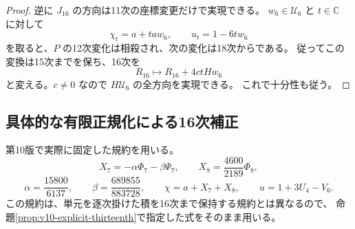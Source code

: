 \documentclass[a4paper,11pt]{ltjsarticle}
\theoremstyle{definition}
\newcommand{\CC}{\mathbb C}
\begin{document}
\begin{proof}
逆に $J_{16}$ の方向は11次の座標変更だけで実現できる。
$w_6\in\mathcal U_6$ と $t\in\CC$ に対して
\[
 \chi_t=a+taw_6,\qquad u_t=1-6tw_6
\]
を取ると、$P$ の12次変化は相殺され、次の変化は18次からである。
従ってこの変換は15次までを保ち、16次を
\[
 R_{16}\longmapsto R_{16}+4ctHw_6
\]
と変える。$c\ne0$ なので $H\mathcal U_6$ の全方向を実現できる。
これで十分性も従う。
\end{proof}

\subsection{具体的な有限正規化による16次補正}
\label{subsec:v13-sixteenth-correction}

第10版で実際に固定した規約を用いる。
\[
 X_7=-\alpha\Phi_7-\beta\Psi_7,\qquad
 X_8=\frac{4600}{2189}\Phi_8,
\]
\[
 \alpha=\frac{15800}{6137},\qquad
 \beta=\frac{689855}{883728},\qquad
 \chi=a+X_7+X_8,\qquad u=1+3U_4-V_6.
\]
この規約は、単元を逐次掛けた積を16次まで保持する規約とは異なるので、
命題\ref{prop:v10-explicit-thirteenth}で指定した式をそのまま用いる。
\end{document}
